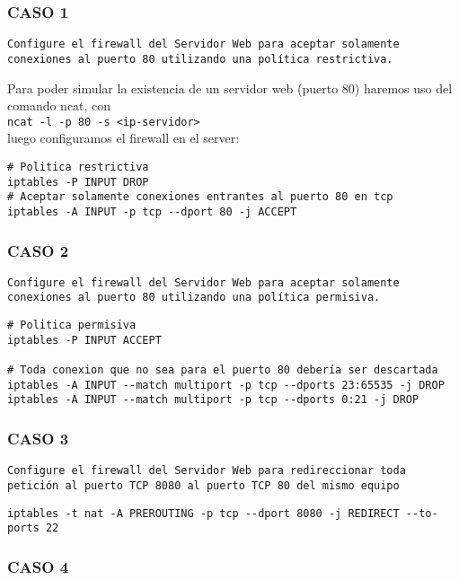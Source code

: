 \subsubsection*{CASO 1}

\texttt{Configure el firewall del Servidor Web para aceptar solamente conexiones al puerto 80 utilizando una política restrictiva.} 


Para poder simular la existencia de un servidor web (puerto 80) haremos uso del comando ncat, con \\
\texttt{ncat -l -p 80 -s <ip-servidor>} \\
luego configuramos el firewall en el server:

\begin{lstlisting}
# Politica restrictiva
iptables -P INPUT DROP
# Aceptar solamente conexiones entrantes al puerto 80 en tcp
iptables -A INPUT -p tcp --dport 80 -j ACCEPT
\end{lstlisting}

\subsubsection*{CASO 2}

\texttt{Configure el firewall del Servidor Web para aceptar solamente conexiones al puerto 80 utilizando una política permisiva.} 

\begin{lstlisting}
# Politica permisiva
iptables -P INPUT ACCEPT

# Toda conexion que no sea para el puerto 80 debería ser descartada
iptables -A INPUT --match multiport -p tcp --dports 23:65535 -j DROP 
iptables -A INPUT --match multiport -p tcp --dports 0:21 -j DROP 
\end{lstlisting}

\subsubsection*{CASO 3}

\texttt{Configure el firewall del Servidor Web para redireccionar toda petición al
puerto TCP 8080 al puerto TCP 80 del mismo equipo}

\begin{lstlisting}
iptables -t nat -A PREROUTING -p tcp --dport 8080 -j REDIRECT --to-ports 22
\end{lstlisting}

\subsubsection*{CASO 4}

